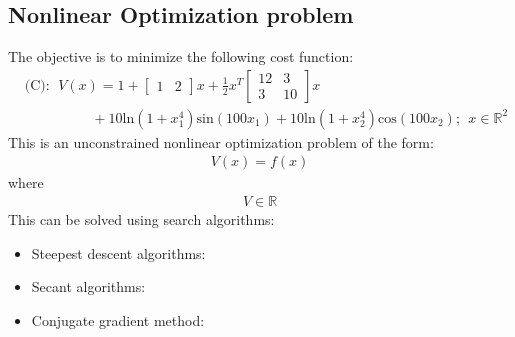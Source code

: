 \subsection{Nonlinear Optimization problem}
The objective is to minimize the following cost function:
\begin{align}
& \mbox{(C)}: \ \  V(x) = 1 + \left[ \begin{array}{cc} 1 & 2 \end{array} \right] x + \frac{1}{2} x^T \left[ \begin{array}{cc} 12 & 3 \\ 3 & 10 \end{array} \right] x  \\
& \hspace{2cm} + 10 \mbox{ln}(1+ x_1^4) \mbox{sin}(100x_1)+ 10 \mbox{ln}(1+x_2^4) \mbox{cos}(100x_2)  ; \ \  x \in \mathbb{R}^2  \nonumber
\end{align}
This is an unconstrained nonlinear optimization problem of the form:
\begin{align}
    V(x) = f(x)
\end{align}
where 
\begin{align}
    V \in \mathbb{R}
\end{align}
This can be solved using search algorithms: 
\begin{itemize}
    \item Steepest descent algorithms: 
    \item Secant algorithms: 
    \item Conjugate gradient method: 
\end{itemize}

